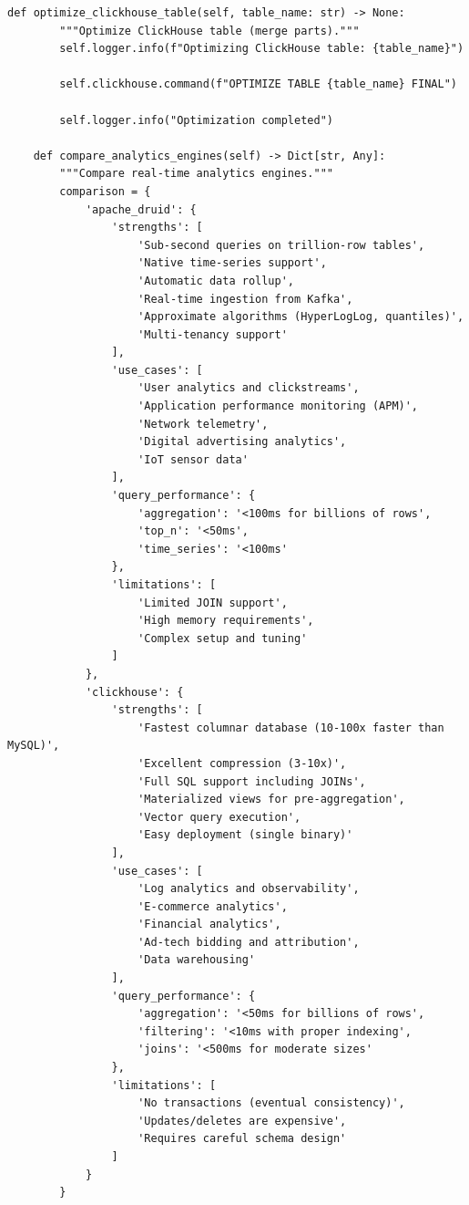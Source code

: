 \begin{lstlisting}[style=python, caption=RealtimeAnalyzer with Sub-Second Query Performance]
    def optimize_clickhouse_table(self, table_name: str) -> None:
        """Optimize ClickHouse table (merge parts)."""
        self.logger.info(f"Optimizing ClickHouse table: {table_name}")

        self.clickhouse.command(f"OPTIMIZE TABLE {table_name} FINAL")

        self.logger.info("Optimization completed")

    def compare_analytics_engines(self) -> Dict[str, Any]:
        """Compare real-time analytics engines."""
        comparison = {
            'apache_druid': {
                'strengths': [
                    'Sub-second queries on trillion-row tables',
                    'Native time-series support',
                    'Automatic data rollup',
                    'Real-time ingestion from Kafka',
                    'Approximate algorithms (HyperLogLog, quantiles)',
                    'Multi-tenancy support'
                ],
                'use_cases': [
                    'User analytics and clickstreams',
                    'Application performance monitoring (APM)',
                    'Network telemetry',
                    'Digital advertising analytics',
                    'IoT sensor data'
                ],
                'query_performance': {
                    'aggregation': '<100ms for billions of rows',
                    'top_n': '<50ms',
                    'time_series': '<100ms'
                },
                'limitations': [
                    'Limited JOIN support',
                    'High memory requirements',
                    'Complex setup and tuning'
                ]
            },
            'clickhouse': {
                'strengths': [
                    'Fastest columnar database (10-100x faster than MySQL)',
                    'Excellent compression (3-10x)',
                    'Full SQL support including JOINs',
                    'Materialized views for pre-aggregation',
                    'Vector query execution',
                    'Easy deployment (single binary)'
                ],
                'use_cases': [
                    'Log analytics and observability',
                    'E-commerce analytics',
                    'Financial analytics',
                    'Ad-tech bidding and attribution',
                    'Data warehousing'
                ],
                'query_performance': {
                    'aggregation': '<50ms for billions of rows',
                    'filtering': '<10ms with proper indexing',
                    'joins': '<500ms for moderate sizes'
                },
                'limitations': [
                    'No transactions (eventual consistency)',
                    'Updates/deletes are expensive',
                    'Requires careful schema design'
                ]
            }
        }


\end{lstlisting}

